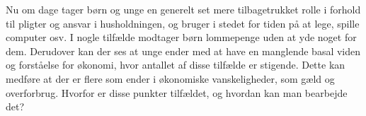 Nu om dage tager børn og unge en generelt set mere tilbagetrukket rolle i forhold til pligter og ansvar i husholdningen, og bruger i stedet for tiden på at lege, spille computer osv\cite{Boerneliv}. I nogle tilfælde modtager børn lommepenge uden at yde noget for dem. Derudover kan der ses at unge ender med at have en manglende basal viden og forståelse for økonomi, hvor antallet af disse tilfælde er stigende\cite{BusinessDK2}. Dette kan medføre at der er flere som ender i økonomiske vanskeligheder, som gæld og overforbrug. Hvorfor er disse punkter tilfældet, og hvordan kan man bearbejde det?